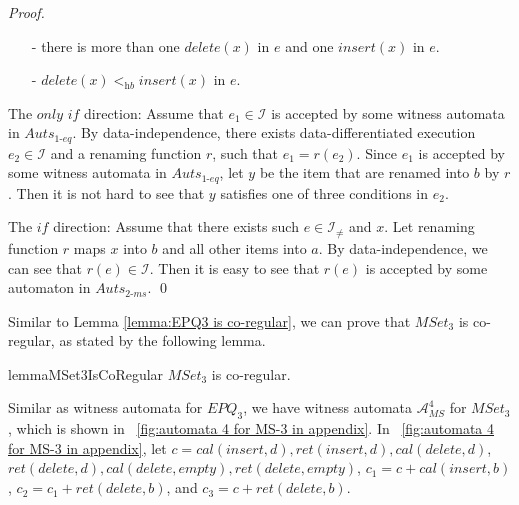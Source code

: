 {\begin {proof}
\begin{itemize}
\item[-] there is more than one $\textit{delete}(x)$ in $e$ and one $\textit{insert}(x)$ in $e$.

\item[-] $\textit{delete}(x) <_{\textit{hb}} \textit{insert}(x)$ in $e$.
\end{itemize}

\noindent The $\textit{only if}$ direction: Assume that $e_1 \in \mathcal{I}$ is accepted by some witness automata in $\textit{Auts}_{\textit{1-eq}}$. By data-independence, there exists data-differentiated execution $e_2 \in \mathcal{I}$ and a renaming function $r$, such that $e_1=r(e_2)$. Since $e_1$ is accepted by some witness automata in  $\textit{Auts}_{\textit{1-eq}}$, let $y$ be the item that are renamed into $b$ by $r$. Then it is not hard to see that $y$ satisfies one of three conditions in $e_2$.

\noindent The $\textit{if}$ direction: Assume that there exists such $e \in \mathcal{I}_{\neq}$ and $x$. Let renaming function $r$ maps $x$ into $b$ and all other items into $a$. By data-independence, we can see that $r(e) \in \mathcal{I}$. Then it is easy to see that $r(e)$ is accepted by some automaton in $\textit{Auts}_{\textit{2-ms}}$. \qed
\end {proof}

Similar to Lemma \ref{lemma:EPQ3 is co-regular}, we can prove that $\textit{MSet}_3$ is co-regular, as stated by the following lemma.

\begin{restatable}{lemma}{MSet3IsCoRegular}
\label{lemma:MSet3 is co-regular}
$\textit{MSet}_3$ is co-regular.
\end{restatable}

Similar as witness automata for $\textit{EPQ}_3$, we have witness automata $\mathcal{A}_{\textit{MS}}^4$ for $\textit{MSet}_3$, which is shown in \figurename~\ref{fig:automata 4 for MS-3 in appendix}. In \figurename~\ref{fig:automata 4 for MS-3 in appendix}, let $c = \textit{cal}(\textit{insert},d),\textit{ret}(\textit{insert},d), \textit{cal}(\textit{delete},d)$, $\textit{ret}(\textit{delete},d),\textit{cal}(\textit{delete},\textit{empty}),\textit{ret}(\textit{delete},\textit{empty})$, $c_1 = c + \textit{cal}(\textit{insert},b)$, $c_2 = c_1 + \textit{ret}(\textit{delete},b)$, and $c_3 = c + \textit{ret}(\textit{delete},b)$.

}
